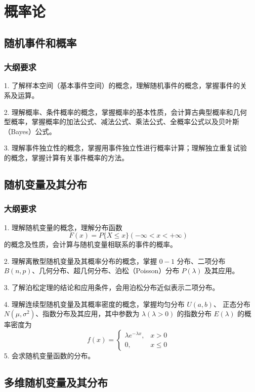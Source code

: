 \chapter{概率论}

\section{随机事件和概率}

\subsection{大纲要求}

1. 了解样本空间（基本事件空间）的概念，理解随机事件的概念，掌握事件的关系及运算。

2. 理解概率、条件概率的概念，掌握概率的基本性质，会计算古典型概率和几何型概率，掌握概率的加法公式、减法公式、乘法公式、全概率公式以及贝叶斯（Bayes）公式。

3. 理解事件独立性的概念，掌握用事件独立性进行概率计算；理解独立重复试验的概念，掌握计算有关事件概率的方法。


\section{随机变量及其分布}

\subsection{大纲要求}

1. 理解随机变量的概念，理解分布函数
$$
F(x) = P\{X \leqslant x\}(-\infty < x < +\infty)
$$
的概念及性质，会计算与随机变量相联系的事件的概率。

2. 理解离散型随机变量及其概率分布的概念，掌握 $0-1$ 分布、二项分布 $B(n, p)$、几何分布、超几何分布、泊松（Poisson）分布 $P(\lambda)$ 及其应用。

3. 了解泊松定理的结论和应用条件，会用泊松分布近似表示二项分布。

4. 理解连续型随机变量及其概率密度的概念，掌握均匀分布 $U(a, b)$、 正态分布 $N(\mu, \sigma^2)$、指数分布及其应用，其中参数为 $\lambda(\lambda > 0)$ 的指数分布 $E(\lambda)$ 的概率密度为
$$
f(x) = \begin{cases} \lambda e^{-\lambda x}, & x > 0 \\ 0, &x \leqslant 0 \end{cases}
$$
5. 会求随机变量函数的分布。


\section{多维随机变量及其分布}

